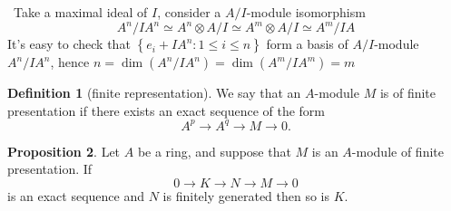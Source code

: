 \documentclass[a4paper,12pt]{article}
\newenvironment{prooff}{{\noindent\it\textcolor{cyan!40!black}{Proof}:}\,}{\par}
\newcommand{\bbrace}[1]{\left\{ #1 \right\} }
\theoremstyle{definition}
\newtheorem{defn}{Definition}[subsection]
\newtheorem{prop}[defn]{Proposition}
\begin{document}
\begin{prooff}
    Take a maximal ideal of $I$, consider a $A/I$-module isomorphism
    $$A^n/IA^{n}\simeq A^n\otimes A/I \simeq  A^m\otimes A/I\simeq A^m/IA$$
    It's easy to check that $\bbrace{e_i+IA^n:1\le i\le n}$ form a basis of $A/I$-module $A^n/IA^{n}$, hence $n=\dim(A^n/IA^{n})=\dim(A^m/IA^{m})=m $
\end{prooff}
\begin{defn}[finite representation]
    We say that an $A$-module $M$ is of finite presentation if there exists an exact sequence of the form
    $$
        A^p \longrightarrow A^q \longrightarrow M \rightarrow 0 .
    $$
\end{defn}
\begin{prop}
    Let $A$ be a ring, and suppose that $M$ is an $A$-module of finite presentation. If
    $$
        0 \rightarrow K \longrightarrow N \longrightarrow M \rightarrow 0
    $$
    is an exact sequence and $N$ is finitely generated then so is $K$.
\end{prop}
\end{document}
